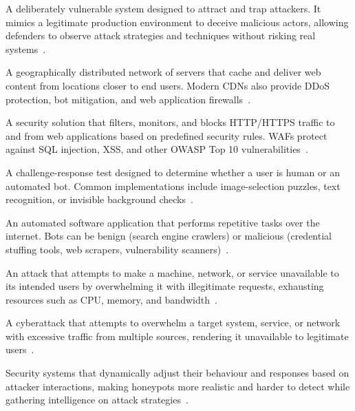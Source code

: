 \documentclass[12pt, a4paper]{report}   %
\begin{document}
\begin{description}[leftmargin=2cm, style=nextline]

  \item[Honeypot]
    A deliberately vulnerable system designed to attract and trap attackers. It mimics
    a legitimate production environment to deceive malicious actors, allowing defenders
    to observe attack strategies and techniques without risking real 
    systems~\cite{serverless-honeypot}.

  \item[Content Delivery Network (CDN)]
    A geographically distributed network of servers that cache and deliver web content
    from locations closer to end users. Modern CDNs also provide DDoS protection, bot
    mitigation, and web application firewalls~\cite{cf-how-works}.

  \item[Web Application Firewall (WAF)]
    A security solution that filters, monitors, and blocks HTTP/HTTPS traffic to and
    from web applications based on predefined security rules. WAFs protect against SQL
    injection, XSS, and other OWASP Top 10 vulnerabilities~\cite{owasp-waf}.

  \item[CAPTCHA]
    A challenge-response test designed to determine whether a user is human or an
    automated bot. Common implementations include image-selection puzzles, text
    recognition, or invisible background checks~\cite{cf-captcha-end}.

  \item[Bot]
    An automated software application that performs repetitive tasks over the internet.
    Bots can be benign (search engine crawlers) or malicious (credential stuffing
    tools, web scrapers, vulnerability scanners)~\cite{cf-verified-bots}.

  \item[DoS (Denial of Service)]
    An attack that attempts to make a machine, network, or service unavailable to its
    intended users by overwhelming it with illegitimate requests, exhausting resources
    such as CPU, memory, and bandwidth~\cite{stallings2003dos}.

  \item[DDoS (Distributed Denial of Service)]
    A cyberattack that attempts to overwhelm a target system, service, or network with
    excessive traffic from multiple sources, rendering it unavailable to legitimate
    users~\cite{cf-ddos}.

  \item[Adaptive Deception Technology]
    Security systems that dynamically adjust their behaviour and responses based on
    attacker interactions, making honeypots more realistic and harder to detect while
    gathering intelligence on attack strategies~\cite{awesome-honeypots}.


\end{description}
\end{document}
